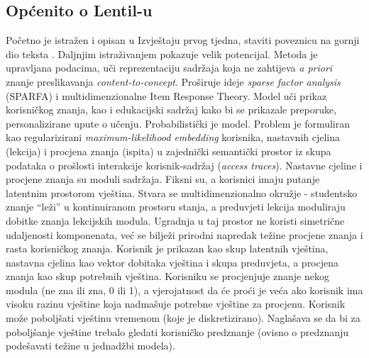 \subsection{Općenito o Lentil-u}
Početno je istražen i opisan u {\color{red}Izvještaju prvog tjedna, staviti poveznicu na gornji dio teksta} \citep{6}. Daljnjim istraživanjem pokazuje velik potencijal. Metoda je upravljana podacima, uči reprezentaciju sadržaja koja ne zahtijeva \textit{a priori} znanje preslikavanja \textit{content-to-concept}. Proširuje ideje \textit{sparse factor analysis} (SPARFA) i multidimenzionalne Item Response Theory.\newline
Model uči prikaz korisničkog znanja, kao i edukacijski sadržaj kako bi se prikazale preporuke, personalizirane upute o učenju. Probabilistički je model. Problem je formuliran kao regularizirani \textit{maximum-likelihood embedding} korisnika, nastavnih cjelina (lekcija) i procjena znanja (ispita) u zajednički semantički prostor iz skupa podataka o prošlosti interakcije korisnik-sadržaj (\textit{access traces}). Nastavne cjeline i procjene znanja su moduli sadržaja. Fiksni su, a korisnici imaju putanje latentnim prostorom vještina. Stvara se multidimenzionalno okružje - studentsko znanje “leži” u kontinuiranom prostoru stanja, a preduvjeti lekcija moduliraju dobitke znanja lekcijskih modula. Ugradnja u taj prostor ne koristi simetrične udaljenosti komponenata, već se bilježi prirodni napredak težine procjene znanja i rasta korisničkog znanja.\newline
Korisnik je prikazan kao skup latentnih vještina, nastavna cjelina kao vektor dobitaka vještina i skupa preduvjeta, a procjena znanja kao skup potrebnih vještina. Korisniku se procjenjuje znanje nekog modula (ne zna ili zna, 0 ili 1), a vjerojatnost da će proći je veća ako korisnik ima visoku razinu vještine koja nadmašuje potrebne vještine za procjenu. Korisnik može poboljšati vještinu vremenom (koje je diskretizirano). Naglašava se da bi za poboljšanje vještine trebalo gledati korisničko predznanje (ovisno o predznanju podešavati težine u jednadžbi modela). 

